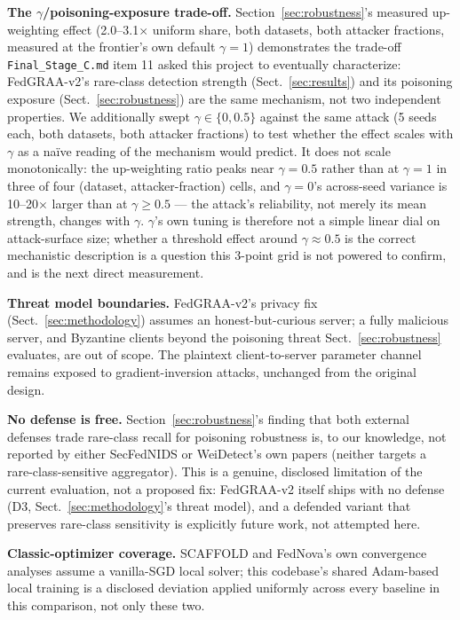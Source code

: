 \documentclass{llncs}
\begin{document}
\textbf{The $\gamma$/poisoning-exposure trade-off.} Section~\ref{sec:robustness}'s measured up-weighting effect (2.0--3.1$\times$ uniform share, both datasets, both attacker fractions, measured at the frontier's own default $\gamma=1$) demonstrates the trade-off \texttt{Final\_Stage\_C.md} item 11 asked this project to eventually characterize: FedGRAA-v2's rare-class detection strength (Sect.~\ref{sec:results}) and its poisoning exposure (Sect.~\ref{sec:robustness}) are the same mechanism, not two independent properties. We additionally swept $\gamma \in \{0, 0.5\}$ against the same attack (5 seeds each, both datasets, both attacker fractions) to test whether the effect scales with $\gamma$ as a na\"{i}ve reading of the mechanism would predict. It does not scale monotonically: the up-weighting ratio peaks near $\gamma=0.5$ rather than at $\gamma=1$ in three of four (dataset, attacker-fraction) cells, and $\gamma=0$'s across-seed variance is 10--20$\times$ larger than at $\gamma \ge 0.5$ --- the attack's reliability, not merely its mean strength, changes with $\gamma$. $\gamma$'s own tuning is therefore not a simple linear dial on attack-surface size; whether a threshold effect around $\gamma\approx0.5$ is the correct mechanistic description is a question this 3-point grid is not powered to confirm, and is the next direct measurement.

\textbf{Threat model boundaries.} FedGRAA-v2's privacy fix (Sect.~\ref{sec:methodology}) assumes an honest-but-curious server; a fully malicious server, and Byzantine clients beyond the poisoning threat Sect.~\ref{sec:robustness} evaluates, are out of scope. The plaintext client-to-server parameter channel remains exposed to gradient-inversion attacks, unchanged from the original design.

\textbf{No defense is free.} Section~\ref{sec:robustness}'s finding that both external defenses trade rare-class recall for poisoning robustness is, to our knowledge, not reported by either SecFedNIDS or WeiDetect's own papers (neither targets a rare-class-sensitive aggregator). This is a genuine, disclosed limitation of the current evaluation, not a proposed fix: FedGRAA-v2 itself ships with no defense (D3, Sect.~\ref{sec:methodology}'s threat model), and a defended variant that preserves rare-class sensitivity is explicitly future work, not attempted here.

\textbf{Classic-optimizer coverage.} SCAFFOLD and FedNova's own convergence analyses assume a vanilla-SGD local solver; this codebase's shared Adam-based local training is a disclosed deviation applied uniformly across every baseline in this comparison, not only these two.
\end{document}
